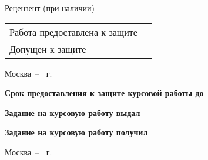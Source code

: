 \documentclass[14pt, a4paper, titlepage]{extarticle}
\begin{document}
\begin{titlepage}
	Рецензент (при наличии)  \hfill{} \bigskip\par
	\begin{tabular}{@{}ll}
		Работа предоставлена к защите & \blankDate{}{} \bigskip\\
		Допущен к защите & \blankDate{}{}
	\end{tabular}
	\begin{center}
		\vfill Москва~-- \the\year{}~г.
	\end{center}
	\newpage
	\textbf{Срок предоставления к защите курсовой работы до} \hfill\blankDate{}{} \par
	\textbf{Задание на курсовую работу выдал}  \hfill{} \par
	\hfill\blankDate{}{} \par
	\textbf{Задание на курсовую работу получил}  \hfill{} \par\bigskip
	\begin{center}
		Москва~-- \the\year{}~г.
	\end{center}
\end{titlepage}
\addtocounter{page}{2}
\end{document}
